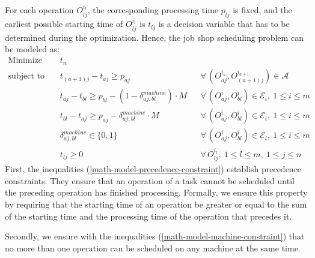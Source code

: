 \documentclass{mimosis}
\begin{document}
For each operation \(O_{lj}^{i_l}\), the corresponding processing time \(p_{lj}\) is fixed, and the earliest possible starting time of \(O_{lj}^{i_l}\) is \(t_{lj}\) is a decision variable that has to be determined during the optimization. Hence, the job shop scheduling problem can be modeled as:
\begin{align}
\text{Minimize } \quad & t_n \label{eq:objective} \\
\text{subject to} \quad 
&t_{(a+1)j} - t_{aj} \ge p_{aj} 
&& \forall\, (O_{aj}^{i_a}, O_{(a+1)j}^{i_{a+1}}) \in \mathcal{A}
\label{math-model-precedence-constraint} \\
&t_{aj} - t_{bl} \ge p_{bl} - (1 - \delta_{aj,bl}^{machine}) \cdot M
&& \forall\, (O_{aj}^{i}, O_{bl}^{i}) \in \mathcal{E}_i,\ 1 \le i \le m
\label{math-model-machine-constraint-bigM1} \\
&t_{bl} - t_{aj} \ge p_{aj} - \delta_{aj,bl}^{machine} \cdot M
&& \forall\, (O_{aj}^{i}, O_{bl}^{i}) \in \mathcal{E}_i,\ 1 \le i \le m
\label{math-model-machine-constraint-bigM2} \\
&\delta_{aj,bl}^{machine} \in \{0,1\}
&& \forall\, (O_{aj}^{i}, O_{bl}^{i}) \in \mathcal{E}_i,\ 1 \le i \le m
\label{math-model-delta-machine} \\
&t_{lj} \ge 0 
&& \forall\, O_{lj}^{i_l},\ 1 \leq l \leq m,\ 1 \leq j \leq n
\label{math-model-nonnegative-constraint}
\end{align}
First, the inequalities (\ref{math-model-precedence-constraint}) establish precedence constraints. They ensure that an operation of a task cannot be scheduled until the preceding operation has finished processing. Formally, we ensure this property by requiring that the starting time of an operation be greater or equal to the sum of the starting time and the processing time of the operation that precedes it.

Secondly, we ensure with the inequalities (\ref{math-model-machine-constraint}) that no more than one operation can be scheduled on any machine at the same time. 
\end{document}
